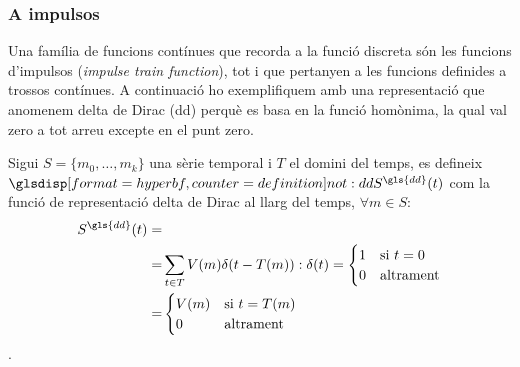 \subsubsection{A impulsos}

Una família de funcions contínues que recorda a la funció discreta són
les funcions d'impulsos (\emph{impulse train function}), tot i que
pertanyen a les funcions definides a trossos contínues.  A continuació
ho exemplifiquem amb una representació que anomenem delta de Dirac
(\gls{dd}) perquè es basa en la funció homònima, la qual val zero a
tot arreu excepte en el punt zero.

\begin{definition}
  Sigui $S=\{m_0,\ldots,m_k\}$ una sèrie temporal i $T$ el domini del
  temps, es defineix $\glsdispdef{not:dd}{S^{\gls{dd}}(t)}$ com la
  funció de representació delta de Dirac al llarg del temps, $\forall
  m \in S:$
  \begin{align*}
    S^{\gls{dd}}(t) = &  \\
    = & \sum_{t\in T} V(m) \delta(t-T(m)): \delta(t)= 
      \begin{cases}
        1 & \text{si }  t=0 \\
        0 & \text{altrament}
      \end{cases} \\
    = & \begin{cases}
      V(m) & \text{si }  t=T(m) \\
      0 & \text{altrament}
    \end{cases}
         \end{align*}.
\end{definition}



